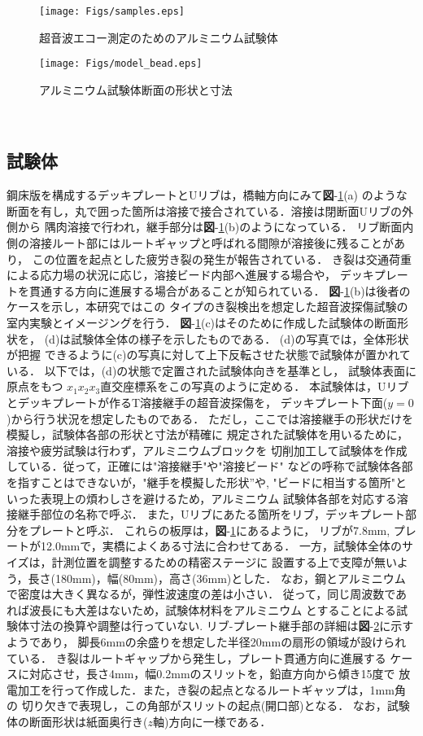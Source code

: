 \begin{figure}[thb]
\centering
	\texttt{[image: Figs/samples.eps]}
\caption{超音波エコー測定のためのアルミニウム試験体}
\label{fig:spec}
\end{figure}
\begin{figure}[htb]
\centering
	\texttt{[image: Figs/model\_bead.eps]}
	\caption{アルミニウム試験体断面の形状と寸法}
	\label{fig:model}
\end{figure}
﻿\subsection{試験体}
鋼床版を構成するデッキプレートとUリブは，橋軸方向にみて{\bf 図}-\ref{fig:spec}(a)
のような断面を有し，丸で囲った箇所は溶接で接合されている．溶接は閉断面Uリブの外側から
隅肉溶接で行われ，継手部分は{\bf 図}-\ref{fig:spec}(b)のようになっている．
リブ断面内側の溶接ルート部にはルートギャップと呼ばれる間隙が溶接後に残ることがあり，
この位置を起点とした疲労き裂の発生が報告されている\cite{Urib3}．
き裂は交通荷重による応力場の状況に応じ，溶接ビード内部へ進展する場合や，
デッキプレートを貫通する方向に進展する場合があることが知られている．
{\bf 図}-\ref{fig:spec}(b)は後者のケースを示し，本研究ではこの
タイプのき裂検出を想定した超音波探傷試験の室内実験とイメージングを行う．
{\bf 図}-\ref{fig:spec}(c)はそのために作成した試験体の断面形状を，
(d)は試験体全体の様子を示したものである． (d)の写真では，全体形状が把握
できるように(c)の写真に対して上下反転させた状態で試験体が置かれている．
以下では，(d)の状態で定置された試験体向きを基準とし， 試験体表面に原点をもつ
$x_1x_2x_3$直交座標系をこの写真のように定める． 
%
本試験体は，Uリブとデッキプレートが作るT溶接継手の超音波探傷を，
デッキプレート下面($y=0$)から行う状況を想定したものである．
ただし，ここでは溶接継手の形状だけを模擬し，試験体各部の形状と寸法が精確に
規定された試験体を用いるために，溶接や疲労試験は行わず，アルミニウムブロックを
切削加工して試験体を作成している．従って，正確には"溶接継手"や"溶接ビード"
などの呼称で試験体各部を指すことはできないが，"継手を模擬した形状”や,
"ビードに相当する箇所"といった表現上の煩わしさを避けるため，アルミニウム
試験体各部を対応する溶接継手部位の名称で呼ぶ．
また，Uリブにあたる箇所をリブ，デッキプレート部分をプレートと呼ぶ．
これらの板厚は，{\bf 図}-\ref{fig:spec}にあるように，
リブが7.8mm, プレートが12.0mmで，実橋によくある寸法に合わせてある．
一方，試験体全体のサイズは，計測位置を調整するための精密ステージに
設置する上で支障が無いよう，長さ(180mm)，幅(80mm)，高さ(36mm)とした．
なお，鋼とアルミニウムで密度は大きく異なるが，弾性波速度の差は小さい．
従って，同じ周波数であれば波長にも大差はないため，試験体材料をアルミニウム
とすることによる試験体寸法の換算や調整は行っていない.
リブ-プレート継手部の詳細は{\bf 図}-\ref{fig:model}に示すようであり，
脚長6mmの余盛りを想定した半径20mmの扇形の領域が設けられている．
き裂はルートギャップから発生し，プレート貫通方向に進展する
ケースに対応させ，長さ4mm，幅0.2mmのスリットを，鉛直方向から傾き15度で
放電加工を行って作成した．また，き裂の起点となるルートギャップは，1mm角の
切り欠きで表現し，この角部がスリットの起点(開口部)となる．
なお，試験体の断面形状は紙面奥行き($z$軸)方向に一様である．
